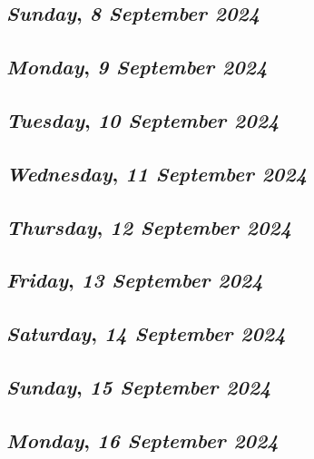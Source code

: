 \def\day{\textit{8 September 2024}}
\def\weekday{\textit{Sunday}}
\subsection*{\weekday, \day}

\def\day{\textit{9 September 2024}}
\def\weekday{\textit{Monday}}
\subsection*{\weekday, \day}

\def\day{\textit{10 September 2024}}
\def\weekday{\textit{Tuesday}}
\subsection*{\weekday, \day}

\def\day{\textit{11 September 2024}}
\def\weekday{\textit{Wednesday}}
\subsection*{\weekday, \day}

\def\day{\textit{12 September 2024}}
\def\weekday{\textit{Thursday}}
\subsection*{\weekday, \day}

\def\day{\textit{13 September 2024}}
\def\weekday{\textit{Friday}}
\subsection*{\weekday, \day}

\def\day{\textit{14 September 2024}}
\def\weekday{\textit{Saturday}}
\subsection*{\weekday, \day}

\def\day{\textit{15 September 2024}}
\def\weekday{\textit{Sunday}}
\subsection*{\weekday, \day}

\def\day{\textit{16 September 2024}}
\def\weekday{\textit{Monday}}
\subsection*{\weekday, \day}

